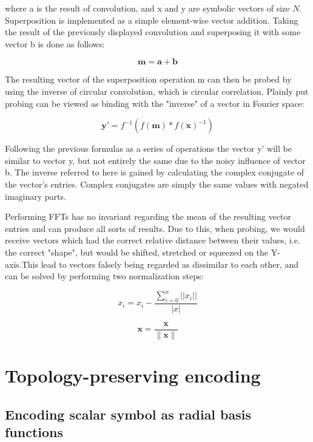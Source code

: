 \documentclass[conference]{IEEEtran}
\begin{document}
	where \pmb a is the result of convolution, and \pmb x and \pmb y are symbolic vectors of size $N$.
Superposition is implemented as a simple element-wise vector addition. Taking the result of the previously displayed convolution and superposing it with some vector \pmb b is done as follows:

	\begin{equation}
	\pmb m = \pmb a + \pmb b
	\end{equation}

The resulting vector of the superposition operation \pmb m can then be probed by using the inverse of circular convolution, which is circular correlation. Plainly put probing can be viewed as binding with the "inverse" of a vector in Fourier space:
	
	\begin{equation}
	\pmb y' = f^{-1}(f(\pmb m) * f(\pmb x)^{-1})
	\end{equation} 

Following the previous formulas as a series of operations the vector \pmb y' will be similar to vector \pmb y, but not entirely the same due to the noisy influence of vector \pmb b. The inverse referred to here is gained by calculating the complex conjugate of the vector's entries. Complex conjugates are simply the same values with negated imaginary parts.
		
	Performing FFTs has no invariant regarding the mean of the resulting vector entries and can produce all sorts of results.
Due to this, when probing, we would receive vectors which had the correct relative distance between their values, i.e.
the correct "shape", but would be shifted, stretched or squeezed on the Y-axis.This lead to vectors falsely being regarded as dissimilar to each other, and can be solved by performing two normalization steps:

	\begin{equation}
	x_i = x_i - \frac{\sum_{i=0}^n ||x_i||}{|x|}
	\end{equation} 	
	
	\begin{equation}
	\pmb x = \frac{\pmb x }{ \| \pmb x \|}
	\end{equation} 	
	
	\section{Topology-preserving encoding}
	
	\subsection{Encoding scalar symbol as radial basis functions}
	
\end{document}
